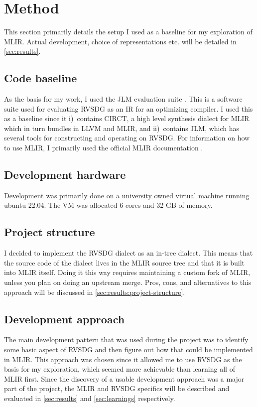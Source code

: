 \section{Method}
This section primarily details the setup I used as a baseline for my exploration of MLIR. Actual development, choice of representations etc. will be detailed in \autoref{sec:results}.

\subsection{Code baseline}
As the basis for my work, I used the JLM evaluation suite \cite{reissmann_github_2022}. This is a software suite used for evaluating RVSDG as an IR for an optimizing compiler. I used this as a baseline since it i)~contains CIRCT, a high level synthesis dialect for MLIR \cite{noauthor_circt_nodate} which in turn bundles in LLVM and MLIR, and ii)~contains JLM, which has several tools for constructing and operating on RVSDG. For information on how to use MLIR, I primarily used the official MLIR documentation \cite{noauthor_mlir_nodate}. 

\subsection{Development hardware}
Development was primarily done on a university owned virtual machine running ubuntu 22.04. The VM was allocated 6 cores and 32 GB of memory.

\subsection{Project structure}
I decided to implement the RVSDG dialect as an in-tree dialect. This means that the source code of the dialect lives in the MLIR source tree and that it is built into MLIR itself. Doing it this way requires maintaining a custom fork of MLIR, unless you plan on doing an upstream merge. Pros, cons, and alternatives to this approach will be discussed in \autoref{sec:results:project-structure}.

\subsection{Development approach}
The main development pattern that was used during the project was to identify some basic aspect of RVSDG and then figure out how that could be implemented in MLIR. This approach was chosen since it allowed me to use RVSDG as the basis for my exploration, which seemed more achievable than learning all of MLIR first. Since the discovery of a usable development approach was a major part of the project, the MLIR and RVSDG specifics will be described and evaluated in \autoref{sec:results} and \autoref{sec:learnings} respectively.
